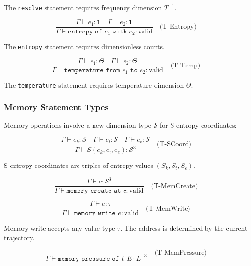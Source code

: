 \documentclass[twocolumn,10pt]{article}
\begin{document}
The \texttt{resolve} statement requires frequency dimension $T^{-1}$.

\begin{equation}
    \frac{\Gamma \vdash e_1 : \mathbf{1} \quad \Gamma \vdash e_2 : \mathbf{1}}{\Gamma \vdash \texttt{entropy of } e_1 \texttt{ with } e_2 : \text{valid}}
    \quad \text{(T-Entropy)}
\end{equation}

The \texttt{entropy} statement requires dimensionless counts.

\begin{equation}
    \frac{\Gamma \vdash e_1 : \Theta \quad \Gamma \vdash e_2 : \Theta}{\Gamma \vdash \texttt{temperature from } e_1 \texttt{ to } e_2 : \text{valid}}
    \quad \text{(T-Temp)}
\end{equation}

The \texttt{temperature} statement requires temperature dimension $\Theta$.

\subsubsection{Memory Statement Types}

Memory operations involve a new dimension type $\mathcal{S}$ for S-entropy coordinates:

\begin{equation}
    \frac{\Gamma \vdash e_k : \mathcal{S} \quad \Gamma \vdash e_t : \mathcal{S} \quad \Gamma \vdash e_e : \mathcal{S}}{\Gamma \vdash S(e_k, e_t, e_e) : \mathcal{S}^3}
    \quad \text{(T-SCoord)}
\end{equation}

S-entropy coordinates are triples of entropy values $(S_k, S_t, S_e)$.

\begin{equation}
    \frac{\Gamma \vdash c : \mathcal{S}^3}{\Gamma \vdash \texttt{memory create at } c : \text{valid}}
    \quad \text{(T-MemCreate)}
\end{equation}

\begin{equation}
    \frac{\Gamma \vdash e : \tau}{\Gamma \vdash \texttt{memory write } e : \text{valid}}
    \quad \text{(T-MemWrite)}
\end{equation}

Memory write accepts any value type $\tau$. The address is determined by the current trajectory.

\begin{equation}
    \frac{}{\Gamma \vdash \texttt{memory pressure of } t : E \cdot L^{-3}}
    \quad \text{(T-MemPressure)}
\end{equation}
\end{document}
